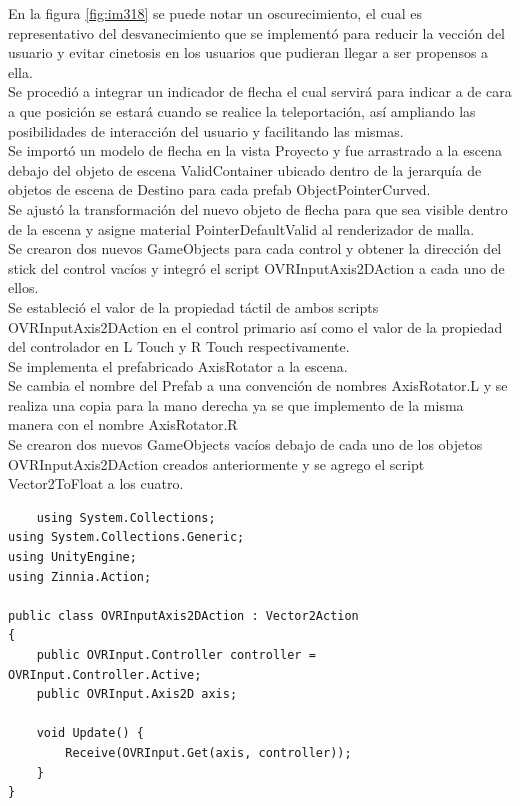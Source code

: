 En la figura \ref{fig:im318} se puede notar un oscurecimiento, el cual es representativo del desvanecimiento que se implementó para reducir la vección del usuario y evitar 
cinetosis en los usuarios que pudieran llegar a ser propensos a ella.\\
Se procedió a integrar un indicador de flecha el cual servirá para indicar a de cara a que posición se estará cuando se realice la teleportación, así ampliando las posibilidades 
de interacción del usuario y facilitando las mismas.\\
Se importó un modelo de flecha en la vista Proyecto y fue arrastrado a la escena debajo del objeto de escena ValidContainer ubicado dentro de la jerarquía de objetos de escena 
de Destino para cada prefab ObjectPointerCurved.\\
Se ajustó la transformación del nuevo objeto de flecha para que sea visible dentro de la escena y asigne material PointerDefaultValid al renderizador de malla.\\
Se crearon dos nuevos GameObjects para cada control y obtener la dirección del stick del control vacíos y integró el script OVRInputAxis2DAction a cada uno de ellos.\\
Se estableció el valor de la propiedad táctil de ambos scripts OVRInputAxis2DAction en el control primario así como el valor de la propiedad del controlador en L Touch 
y R Touch respectivamente.\\
Se implementa el prefabricado AxisRotator a la escena.\\
Se cambia el nombre del Prefab a una convención de nombres AxisRotator.L  y se realiza una copia para la mano derecha ya se que implemento de la misma manera con el nombre AxisRotator.R\\
Se crearon dos nuevos GameObjects vacíos debajo de cada uno de los objetos OVRInputAxis2DAction creados anteriormente y se agrego el script Vector2ToFloat a los cuatro.\\

\begin{verbatim}
    using System.Collections;
using System.Collections.Generic;
using UnityEngine;
using Zinnia.Action;
 
public class OVRInputAxis2DAction : Vector2Action
{
    public OVRInput.Controller controller = OVRInput.Controller.Active;
    public OVRInput.Axis2D axis;
 
    void Update() {
        Receive(OVRInput.Get(axis, controller));
    }
}
\end{verbatim}

